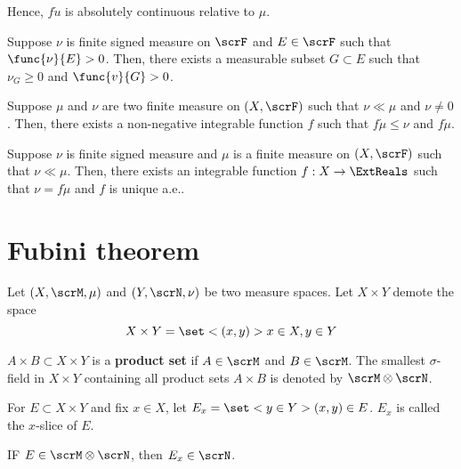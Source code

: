 Hence, \(f \dot u\) is absolutely continuous relative to \(\mu\).
\begin{lemma}
    Suppose \(\nu\) is finite signed measure on \(\scrF\) and \(E \in \scrF\) such that \(\func{\nu}{E} > 0\). Then, there exists a measurable subset \(G \subset E\) such that \(\nu_G \geq 0\) and  \(\func{v}{G} > 0\).
\end{lemma}

\begin{lemma}
    Suppose \(\mu\) and \(\nu\) are two finite measure on \((X,\scrF)\) such that \(\nu \ll \mu\) and \(\nu \neq 0\). Then, there exists a non-negative integrable function \(f\) such that \(f \dot \mu \leq \nu\) and \(f \dot \mu\). 
\end{lemma}

\begin{theorem} 
    Suppose \(\nu\) is finite signed measure and \(\mu\) is a finite measure on \((X,\scrF)\) such that \(\nu \ll \mu\). Then, there exists an integrable function \(f:X \to \ExtReals\) such that \(\nu = f \dot \mu\) and \(f\) is unique a.e.. 
\end{theorem}

\section{Fubini theorem}
Let \((X,\scrM,\mu)\) and \((Y,\scrN,\nu)\) be two measure spaces. Let \(X \times Y\) demote the space 
\begin{equation*}
    X \times Y = \set<(x,y)>{x \in X,y \in Y}
\end{equation*}

\begin{definition}
    \(A \times B \subset X \times Y\) is a \textbf{product set} if \(A \in \scrM\) and \(B \in \scrM\). The smallest \(\sigma\)-field in \(X \times Y\) containing all product sets \(A \times B\) is denoted by \(\scrM \otimes \scrN\). 
\end{definition}

\begin{definition}
    For \(E \subset X \times Y\) and fix \(x \in X\), let \(E_x = \set<y \in Y>{(x,y) \in E}\). \(E_x\) is called the \(x\)-slice of \(E\).
\end{definition}

\begin{proposition}
    IF \(E \in \scrM \otimes \scrN\), then \(E_x \in \scrN\).
\end{proposition}

